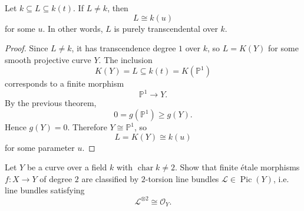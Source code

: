 \documentclass[12pt]{article}
\begin{document}
\begin{theorem}[Lüroth]
    Let \(k\subseteq L\subseteq k(t)\). If \(L\neq k\), then
    \[
        L\cong k(u)
    \]
    for some \(u\). In other words, \(L\) is purely transcendental over \(k\).
\end{theorem}

\begin{proof}
    Since \(L\neq k\), it has transcendence degree \(1\) over \(k\), so \(L=K(Y)\) for some smooth projective curve \(Y\). The inclusion
    \[
        K(Y)=L\subseteq k(t)=K(\mathbb P^1)
    \]
    corresponds to a finite morphism
    \[
        \mathbb P^1\to Y.
    \]
    By the previous theorem,
    \[
        0=g(\mathbb P^1)\ge g(Y).
    \]
    Hence \(g(Y)=0\). Therefore \(Y\cong \mathbb P^1\), so
    \[
        L=K(Y)\cong k(u)
    \]
    for some parameter \(u\).
\end{proof}
\begin{exercise}
    Let \(Y\) be a curve over a field \(k\) with \(\operatorname{char} k\neq 2\). Show that finite étale morphisms $f:X\to Y$
    of degree \(2\) are classified by \(2\)-torsion line bundles \(\mathcal L\in \operatorname{Pic}(Y)\), i.e. line bundles satisfying
    \[
        \mathcal L^{\otimes 2}\cong \mathcal O_Y.
    \]
\end{exercise}
\end{document}
